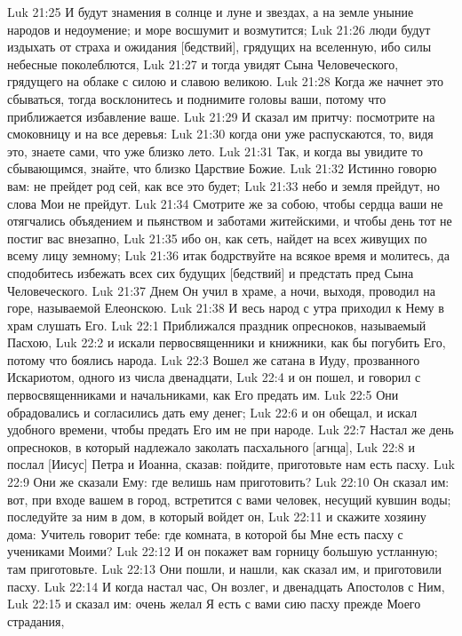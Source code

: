 Luk 21:25  И будут знамения в солнце и луне и звездах, а на земле уныние народов и недоумение; и море восшумит и возмутится;
Luk 21:26  люди будут издыхать от страха и ожидания [бедствий], грядущих на вселенную, ибо силы небесные поколеблются,
Luk 21:27  и тогда увидят Сына Человеческого, грядущего на облаке с силою и славою великою.
Luk 21:28  Когда же начнет это сбываться, тогда восклонитесь и поднимите головы ваши, потому что приближается избавление ваше.
Luk 21:29  И сказал им притчу: посмотрите на смоковницу и на все деревья:
Luk 21:30  когда они уже распускаются, то, видя это, знаете сами, что уже близко лето.
Luk 21:31  Так, и когда вы увидите то сбывающимся, знайте, что близко Царствие Божие.
Luk 21:32  Истинно говорю вам: не прейдет род сей, как все это будет;
Luk 21:33  небо и земля прейдут, но слова Мои не прейдут.
Luk 21:34  Смотрите же за собою, чтобы сердца ваши не отягчались объядением и пьянством и заботами житейскими, и чтобы день тот не постиг вас внезапно,
Luk 21:35  ибо он, как сеть, найдет на всех живущих по всему лицу земному;
Luk 21:36  итак бодрствуйте на всякое время и молитесь, да сподобитесь избежать всех сих будущих [бедствий] и предстать пред Сына Человеческого.
Luk 21:37  Днем Он учил в храме, а ночи, выходя, проводил на горе, называемой Елеонскою.
Luk 21:38  И весь народ с утра приходил к Нему в храм слушать Его.
Luk 22:1  Приближался праздник опресноков, называемый Пасхою,
Luk 22:2  и искали первосвященники и книжники, как бы погубить Его, потому что боялись народа.
Luk 22:3  Вошел же сатана в Иуду, прозванного Искариотом, одного из числа двенадцати,
Luk 22:4  и он пошел, и говорил с первосвященниками и начальниками, как Его предать им.
Luk 22:5  Они обрадовались и согласились дать ему денег;
Luk 22:6  и он обещал, и искал удобного времени, чтобы предать Его им не при народе.
Luk 22:7  Настал же день опресноков, в который надлежало заколать пасхального [агнца],
Luk 22:8  и послал [Иисус] Петра и Иоанна, сказав: пойдите, приготовьте нам есть пасху.
Luk 22:9  Они же сказали Ему: где велишь нам приготовить?
Luk 22:10  Он сказал им: вот, при входе вашем в город, встретится с вами человек, несущий кувшин воды; последуйте за ним в дом, в который войдет он,
Luk 22:11  и скажите хозяину дома: Учитель говорит тебе: где комната, в которой бы Мне есть пасху с учениками Моими?
Luk 22:12  И он покажет вам горницу большую устланную; там приготовьте.
Luk 22:13  Они пошли, и нашли, как сказал им, и приготовили пасху.
Luk 22:14  И когда настал час, Он возлег, и двенадцать Апостолов с Ним,
Luk 22:15  и сказал им: очень желал Я есть с вами сию пасху прежде Моего страдания,

